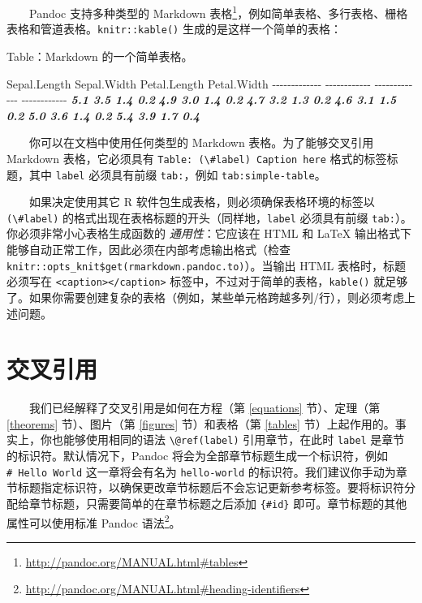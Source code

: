 \documentclass[
  12pt,
]{krantz}
\newenvironment{Shaded}{\begin{snugshade}}{\end{snugshade}}
\newcommand{\InformationTok}[1]{\textcolor[rgb]{0.56,0.35,0.01}{\textbf{\textit{#1}}}}
\newcommand{\NormalTok}[1]{#1}
\renewcommand{\href}[2]{#2\footnote{\url{#1}}}
\theoremstyle{definition}
\theoremstyle{definition}
\theoremstyle{definition}
\theoremstyle{definition}
\theoremstyle{remark}
\begin{document}
  Pandoc 支持多种类型的 \href{http://pandoc.org/MANUAL.html\#tables}{Markdown 表格}，例如简单表格、多行表格、栅格表格和管道表格。\texttt{knitr::kable()} 生成的是这样一个简单的表格：

\begin{Shaded}
\begin{Highlighting}[]
\NormalTok{Table：Markdown 的一个简单表格。}

\NormalTok{ Sepal.Length   Sepal.Width   Petal.Length   Petal.Width}
\NormalTok{{-}{-}{-}{-}{-}{-}{-}{-}{-}{-}{-}{-}{-}  {-}{-}{-}{-}{-}{-}{-}{-}{-}{-}{-}{-}  {-}{-}{-}{-}{-}{-}{-}{-}{-}{-}{-}{-}{-}  {-}{-}{-}{-}{-}{-}{-}{-}{-}{-}{-}{-}}
\InformationTok{          5.1           3.5            1.4           0.2}
\InformationTok{          4.9           3.0            1.4           0.2}
\InformationTok{          4.7           3.2            1.3           0.2}
\InformationTok{          4.6           3.1            1.5           0.2}
\InformationTok{          5.0           3.6            1.4           0.2}
\InformationTok{          5.4           3.9            1.7           0.4}
\end{Highlighting}
\end{Shaded}

  你可以在文档中使用任何类型的 Markdown 表格。为了能够交叉引用 Markdown 表格，它必须具有 \texttt{Table:\ (\textbackslash{}\#label)\ Caption\ here} 格式的标签标题，其中 \texttt{label} 必须具有前缀 \texttt{tab:}，例如 \texttt{tab:simple-table}。

  如果决定使用其它 R 软件包生成表格，则必须确保表格环境的标签以 \texttt{(\textbackslash{}\#label)} 的格式出现在表格标题的开头（同样地，\texttt{label} 必须具有前缀 \texttt{tab:}）。你必须非常小心表格生成函数的 \emph{通用性}：它应该在 HTML 和 LaTeX 输出格式下能够自动正常工作，因此必须在内部考虑输出格式（检查 \texttt{knitr::opts\_knit\$get(\textquotesingle{}rmarkdown.pandoc.to\textquotesingle{})}）。当输出 HTML 表格时，标题必须写在 \texttt{\textless{}caption\textgreater{}\textless{}/caption\textgreater{}} 标签中，不过对于简单的表格，\texttt{kable()} 就足够了。如果你需要创建复杂的表格（例如，某些单元格跨越多列/行），则必须考虑上述问题。

\hypertarget{cross-references}{%
\section{交叉引用}\label{cross-references}}

  我们已经解释了交叉引用是如何在方程（第 \ref{equations} 节）、定理（第 \ref{theorems} 节）、图片（第 \ref{figures} 节）和表格（第 \ref{tables} 节）上起作用的。事实上，你也能够使用相同的语法 \texttt{\textbackslash{}@ref(label)} 引用章节，在此时 \texttt{label} 是章节的标识符。默认情况下，Pandoc 将会为全部章节标题生成一个标识符，例如 \texttt{\#\ Hello\ World} 这一章将会有名为 \texttt{hello-world} 的标识符。我们建议你手动为章节标题指定标识符，以确保更改章节标题后不会忘记更新参考标签。要将标识符分配给章节标题，只需要简单的在章节标题之后添加 \texttt{\{\#id\}} 即可。章节标题的其他属性可以使用标准 \href{http://pandoc.org/MANUAL.html\#heading-identifiers}{Pandoc 语法}。
\end{document}
